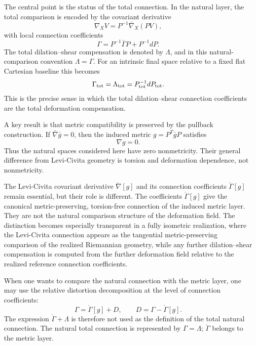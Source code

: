\documentclass[12pt]{amsart}
\theoremstyle{definition}
\theoremstyle{remark}
\begin{document}
The central point is the status of the total connection.  In the natural layer, the total comparison is encoded by the covariant derivative
\begin{equation}
 \nabla_XV=P^{-1}\bar\nabla_X(PV),
\end{equation}
with local connection coefficients
\begin{equation}
 \Gamma=P^{-1}\bar\Gamma P+P^{-1}dP.
\end{equation}
The total dilation--shear compensation is denoted by \(\Lambda\), and in this natural-comparison convention \(\Lambda=\Gamma\).  For an intrinsic final space relative to a fixed flat Cartesian baseline this becomes
\begin{equation}
 \Gamma_{\rm tot}=\Lambda_{\rm tot}=P_{\rm tot}^{-1}dP_{\rm tot}.
\end{equation}
This is the precise sense in which the total dilation--shear connection coefficients are the total deformation compensation.

A key result is that metric compatibility is preserved by the pullback construction.  If \(\bar\nabla\bar g=0\), then the induced metric \(g=P^T\bar gP\) satisfies
\[
 \nabla g=0.
\]
Thus the natural spaces considered here have zero nonmetricity.  Their general difference from Levi-Civita geometry is torsion and deformation dependence, not nonmetricity.

The Levi-Civita covariant derivative \(\mathring\nabla[g]\) and its connection coefficients \(\mathring\Gamma[g]\) remain essential, but their role is different.  The coefficients \(\mathring\Gamma[g]\) give the canonical metric-preserving, torsion-free connection of the induced metric layer.  They are not the natural comparison structure of the deformation field.  The distinction becomes especially transparent in a fully isometric realization, where the Levi-Civita connection appears as the tangential metric-preserving comparison of the realized Riemannian geometry, while any further dilation--shear compensation is computed from the further deformation field relative to the realized reference connection coefficients.

When one wants to compare the natural connection with the metric layer, one may use the relative distortion decomposition at the level of connection coefficients:
\begin{equation}
 \Gamma=\mathring\Gamma[g]+D,
 \qquad D=\Gamma-\mathring\Gamma[g].
\end{equation}
The expression \(\mathring\Gamma+\Lambda\) is therefore not used as the definition of the total natural connection.  The natural total connection is represented by \(\Gamma=\Lambda\); \(\mathring\Gamma\) belongs to the metric layer.
\end{document}
